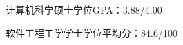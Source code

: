 \documentclass{resume}
\begin{document}
\begin{body}
	{计算机科学硕士学位}{GPA：3.88/4.00}





	\smallskip
	{软件工程工学学士学位}{平均分：84.6/100}
\end{body}
\end{document}
